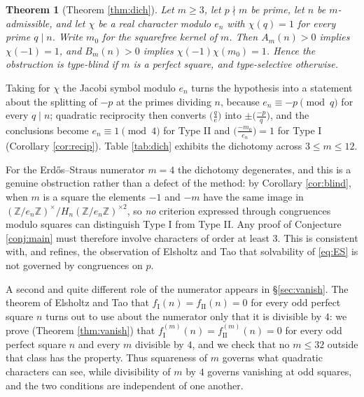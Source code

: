 \documentclass[11pt,reqno]{amsart}
\theoremstyle{plain}
\newtheorem{theorem}{Theorem}[section]
\theoremstyle{definition}
\numberwithin{equation}{section}
\newcommand{\Z}{\mathbb{Z}}
\newcommand{\fI}{f_{\mathrm{I}}}
\newcommand{\fII}{f_{\mathrm{II}}}
\begin{document}
\begin{theorem}[Theorem \ref{thm:dich}]\label{thm:dich-intro}
Let $m\ge3$, let $p\nmid m$ be prime, let $n$ be $m$-admissible, and let $\chi$ be a
real character modulo $e_{n}$ with $\chi(q)=1$ for every prime $q\mid n$. Write
$m_{0}$ for the squarefree kernel of $m$. Then $A_{m}(n)>0$ implies $\chi(-1)=1$, and
$B_{m}(n)>0$ implies $\chi(-1)\chi(m_{0})=1$. Hence the obstruction is type-blind if
$m$ is a perfect square, and type-selective otherwise.
\end{theorem}

Taking for $\chi$ the Jacobi symbol modulo $e_{n}$ turns the hypothesis into a
statement about the splitting of $-p$ at the primes dividing $n$, because
$e_{n}\equiv-p\pmod q$ for every $q\mid n$; quadratic reciprocity then converts
$\bigl(\tfrac qe\bigr)$ into $\pm\bigl(\tfrac{-p}q\bigr)$, and the conclusions become
$e_{n}\equiv1\pmod4$ for Type II and $\bigl(\tfrac{-m_{0}}{e_{n}}\bigr)=1$ for Type I
(Corollary \ref{cor:recip}). Table \ref{tab:dich} exhibits the dichotomy across
$3\le m\le12$.

For the Erd\H{o}s--Straus numerator $m=4$ the dichotomy degenerates, and this is a
genuine obstruction rather than a defect of the method: by Corollary
\ref{cor:blind}, when $m$ is a square the elements $-1$ and $-m$ have the same image
in $(\Z/e_{n}\Z)^{\times}/H_{n}(\Z/e_{n}\Z)^{\times2}$, so \emph{no} criterion
expressed through congruences modulo squares can distinguish Type I from Type II.
Any proof of Conjecture \ref{conj:main} must therefore involve characters of order at
least $3$. This is consistent with, and refines, the observation of Elsholtz and Tao
\cite[Prop.~1.6]{ElsholtzTao} that solvability of \eqref{eq:ES} is not governed by
congruences on $p$.

A second and quite different role of the numerator appears in \S\ref{sec:vanish}. The
theorem of Elsholtz and Tao that $\fI(n)=\fII(n)=0$ for every odd perfect square $n$
turns out to use about the numerator only that it is divisible by $4$: we prove
(Theorem \ref{thm:vanish}) that $\fI^{(m)}(n)=\fII^{(m)}(n)=0$ for every odd perfect
square $n$ and every $m$ divisible by $4$, and we check that no $m\le32$ outside that
class has the property. Thus squareness of $m$ governs what quadratic characters can
see, while divisibility of $m$ by $4$ governs vanishing at odd squares, and the two
conditions are independent of one another.
\end{document}
